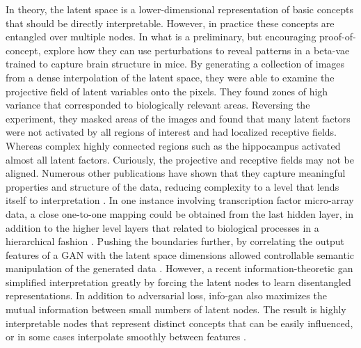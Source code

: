 In theory, the latent space is a lower-dimensional representation of basic concepts that should be directly interpretable. However, in practice these concepts are entangled over multiple nodes. In what is a preliminary, but encouraging proof-of-concept, \cite{lui2019-latent} explore how they can use perturbations to reveal patterns in a \gls{beta-vae} trained to capture brain structure in mice. By generating a collection of images from a dense interpolation of the latent space, they were able to examine the projective field of latent variables onto the pixels. They found zones of high variance that corresponded to biologically relevant areas. Reversing the experiment, they masked areas of the images and found that many latent factors were not activated by all regions of interest and had localized receptive fields. Whereas complex highly connected regions such as the hippocampus activated almost all latent factors. Curiously, the projective and receptive fields may not be aligned. Numerous other publications have shown that they capture meaningful properties and structure of the data, reducing complexity to a level that lends itself to interpretation \cite{Way2020, Koumakis2020}. In one instance involving transcription factor micro-array data, a close one-to-one mapping could be obtained from the last hidden layer, in addition to the higher level layers that related to biological processes in a hierarchical fashion \cite{chen2016-latentyeast}. Pushing the boundaries further, by correlating the output features of a GAN with the latent space dimensions allowed controllable semantic manipulation of the generated data \cite{Wang2020latent,Ding2020latent,Li2020latent}. However, a recent information-theoretic \gls{gan} simplified interpretation greatly by forcing the latent nodes to learn disentangled representations. In addition to adversarial loss, \gls{info-gan} also maximizes the mutual information between small numbers of latent nodes. The result is highly interpretable nodes that represent distinct concepts that can be easily influenced, or in some cases interpolate smoothly between features \cite{Chen2016c}.\par

